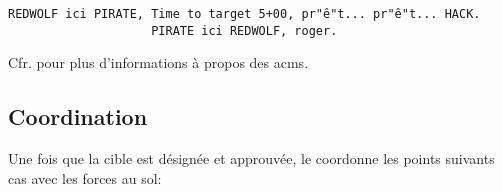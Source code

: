 \begin{e1}
\begin{e2}
\begin{e3}
\begin{e4}
\begin{minipage}{\linewidth}
				\begin{lstlisting}[caption=Synchronisation au moyen d'un HACK, label=hacktime]
					REDWOLF ici PIRATE, Time to target 5+00, pr"ê"t... pr"ê"t... HACK.
					PIRATE ici REDWOLF, roger.
				\end{lstlisting}
				\end{minipage}
				
			\end{e4}
			
		\end{e3}
		
		
	\end{e2}
	\begin{minipage}{\linewidth}
	 {}
	
	\begin{e3}
		 {}
		 {}
		 {}
		 {}
		 {}
		 {}
	\end{e3}
	\end{minipage}
	
	
	Cfr.  pour plus d'informations à propos des \glspl{acm}.
	
\end{e1}


\subsection{Coordination}

Une fois que la cible est désignée et approuvée, le \ja{} coordonne les points suivants \gls{cas} avec les forces au sol:

